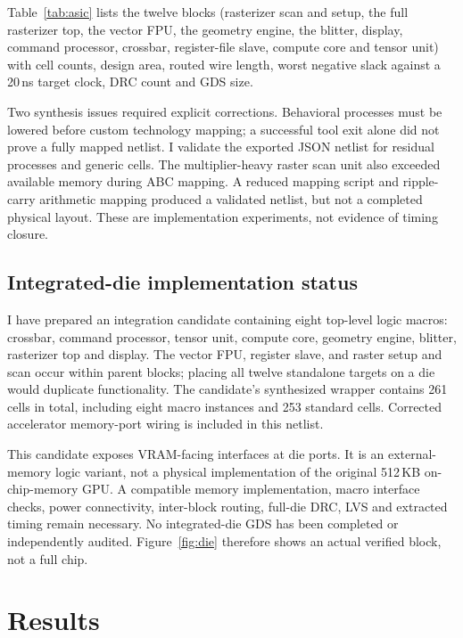 \documentclass[conference]{IEEEtran}
\begin{document}
Table~\ref{tab:asic} lists the twelve blocks (rasterizer scan and setup, the
full rasterizer top, the vector FPU, the geometry engine, the blitter, display,
command processor, crossbar, register-file slave, compute core and tensor unit)
with cell counts, design area, routed wire length, worst negative slack against
a 20\,ns target clock, DRC count and GDS size.

Two synthesis issues required explicit corrections. Behavioral processes must
be lowered before custom technology mapping; a successful tool exit alone did
not prove a fully mapped netlist. I validate the exported JSON netlist for
residual processes and generic cells. The multiplier-heavy raster scan unit
also exceeded available memory during ABC mapping. A reduced mapping script
and ripple-carry arithmetic mapping produced a validated netlist, but not a
completed physical layout. These are implementation experiments, not evidence
of timing closure.

\subsection{Integrated-die implementation status}

I have prepared an integration candidate containing eight top-level logic
macros: crossbar, command processor, tensor unit, compute core, geometry
engine, blitter, rasterizer top and display. The vector FPU, register slave,
and raster setup and scan occur within parent blocks; placing all twelve
standalone targets on a die would duplicate functionality. The candidate's
synthesized wrapper contains 261 cells in total, including eight macro
instances and 253 standard cells. Corrected accelerator memory-port wiring
is included in this netlist.

This candidate exposes VRAM-facing interfaces at die ports. It is an
external-memory logic variant, not a physical implementation of the original
512\,KB on-chip-memory GPU. A compatible memory implementation, macro
interface checks, power connectivity, inter-block routing, full-die DRC, LVS
and extracted timing remain necessary. No integrated-die GDS has been completed
or independently audited. Figure~\ref{fig:die} therefore shows an actual
verified block, not a full chip.



\section{Results}
\label{sec:results}
\end{document}
